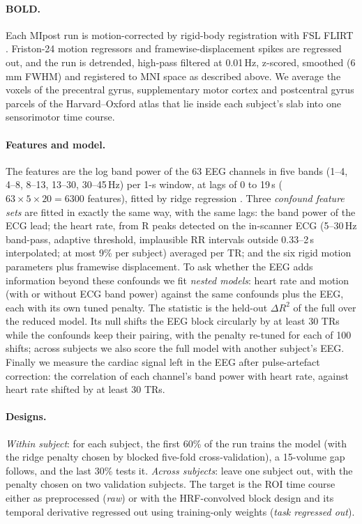 \paragraph{BOLD.} Each MIpost run is motion-corrected by rigid-body registration with FSL FLIRT \citep{jenkinson2002improved}. Friston-24 motion regressors \citep{friston1996movement} and framewise-displacement spikes \citep{power2014methods} are regressed out, and the run is detrended, high-pass filtered at 0.01\,Hz, z-scored, smoothed (6\,mm FWHM) and registered to MNI space as described above. We average the voxels of the precentral gyrus, supplementary motor cortex and postcentral gyrus parcels of the Harvard--Oxford atlas \citep{makris2006decreased,frazier2005structural,desikan2006automated,goldstein2007hypothalamic} that lie inside each subject's slab into one sensorimotor time course.

\paragraph{Features and model.} The features are the log band power of the 63 EEG channels in five bands (1--4, 4--8, 8--13, 13--30, 30--45\,Hz) per 1-s window, at lags of 0 to 19\,s ($63\times5\times20 = 6300$ features), fitted by ridge regression \citep{hoerl1970ridge}. Three \emph{confound feature sets} are fitted in exactly the same way, with the same lags: the band power of the ECG lead; the heart rate, from R peaks detected on the in-scanner ECG (5--30\,Hz band-pass, adaptive threshold, implausible RR intervals outside 0.33--2\,s interpolated; at most 9\% per subject) averaged per TR; and the six rigid motion parameters plus framewise displacement. To ask whether the EEG adds information beyond these confounds we fit \emph{nested models}: heart rate and motion (with or without ECG band power) against the same confounds plus the EEG, each with its own tuned penalty. The statistic is the held-out $\Delta R^2$ of the full over the reduced model. Its null shifts the EEG block circularly by at least 30 TRs while the confounds keep their pairing, with the penalty re-tuned for each of 100 shifts; across subjects we also score the full model with another subject's EEG. Finally we measure the cardiac signal left in the EEG after pulse-artefact correction: the correlation of each channel's band power with heart rate, against heart rate shifted by at least 30 TRs.

\paragraph{Designs.} \emph{Within subject}: for each subject, the first 60\% of the run trains the model (with the ridge penalty chosen by blocked five-fold cross-validation), a 15-volume gap follows, and the last 30\% tests it. \emph{Across subjects}: leave one subject out, with the penalty chosen on two validation subjects. The target is the ROI time course either as preprocessed (\emph{raw}) or with the HRF-convolved block design and its temporal derivative regressed out using training-only weights (\emph{task regressed out}).

